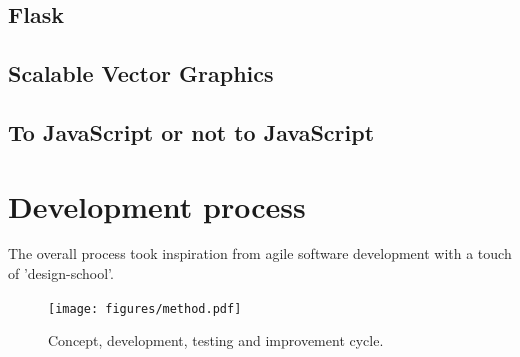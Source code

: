 \documentclass[nofilelist,dvipsnames]{cslthse-msc}
\begin{document}
    \section{Flask}

    \section{Scalable Vector Graphics}

    \section{To JavaScript or not to JavaScript}

	\chapter{Development process}

    The overall process took inspiration from agile software development with a
    touch of 'design-school'. 

    \begin{figure}[h!]
      \centering
      \texttt{[image: figures/method.pdf]}
      \caption{Concept, development, testing and improvement cycle.}
    \end{figure}
\end{document}
